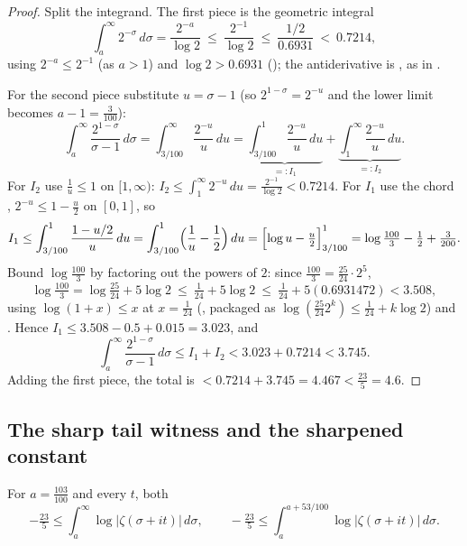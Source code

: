 \begin{proof}
\leanok
Split the integrand. The first piece is the geometric integral
\[
  \int_a^\infty 2^{-\sigma}\,d\sigma=\frac{2^{-a}}{\log2}
    \ \le\ \frac{2^{-1}}{\log2}\ \le\ \frac{1/2}{0.6931}\ <\ 0.7214,
\]
using $2^{-a}\le2^{-1}$ (as $a>1$) and $\log2>0.6931$
(); the antiderivative is
, as in .

For the second piece substitute $u=\sigma-1$ (so $2^{1-\sigma}=2^{-u}$ and the lower
limit becomes $a-1=\tfrac3{100}$):
\[
  \int_a^\infty\frac{2^{1-\sigma}}{\sigma-1}\,d\sigma
    =\int_{3/100}^{\infty}\frac{2^{-u}}u\,du
    =\underbrace{\int_{3/100}^{1}\frac{2^{-u}}u\,du}_{=:I_1}
      +\underbrace{\int_{1}^{\infty}\frac{2^{-u}}u\,du}_{=:I_2}.
\]
For $I_2$ use $\tfrac1u\le1$ on $[1,\infty)$:
$I_2\le\int_1^\infty2^{-u}\,du=\tfrac{2^{-1}}{\log2}<0.7214$.
For $I_1$ use the chord , $2^{-u}\le1-\tfrac u2$ on
$[0,1]$, so
\[
  I_1\le\int_{3/100}^{1}\frac{1-u/2}u\,du
     =\int_{3/100}^{1}\Bigl(\frac1u-\frac12\Bigr)\,du
     =\Bigl[\log u-\tfrac u2\Bigr]_{3/100}^{1}
     =\log\tfrac{100}3-\tfrac12+\tfrac3{200}.
\]
Bound $\log\tfrac{100}3$ by factoring out the powers of $2$: since
$\tfrac{100}3=\tfrac{25}{24}\cdot2^5$,
\[
  \log\tfrac{100}3=\log\tfrac{25}{24}+5\log2\ \le\ \tfrac1{24}+5\log2
    \ \le\ \tfrac1{24}+5(0.6931472)<3.508 ,
\]
using $\log(1+x)\le x$ at $x=\tfrac1{24}$ (, packaged as
$\log(\tfrac{25}{24}2^k)\le\tfrac1{24}+k\log2$) and .
Hence $I_1\le3.508-0.5+0.015=3.023$, and
\[
  \int_a^\infty\frac{2^{1-\sigma}}{\sigma-1}\,d\sigma\le I_1+I_2<3.023+0.7214<3.745 .
\]
Adding the first piece, the total is $<0.7214+3.745=4.467<\tfrac{23}5=4.6$.
\end{proof}

\subsection{The sharp tail witness and the sharpened constant}

\begin{lemma}
\label{lem:le_tail_sharp}
\leanok
{}
For $a=\tfrac{103}{100}$ and every $t$, both
\[
  -\tfrac{23}5\le\int_{a}^{\infty}\log|\zeta(\sigma+it)|\,d\sigma,
  \qquad
  -\tfrac{23}5\le\int_{a}^{a+53/100}\log|\zeta(\sigma+it)|\,d\sigma .
\]
\end{lemma}

